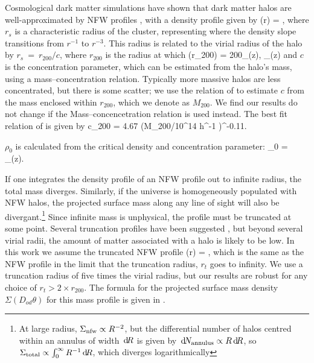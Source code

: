 \documentclass[useAMS,usenatbib]{mn2e}
\begin{document}
Cosmological dark matter simulations have shown that dark matter
halos are well-approximated by NFW profiles \citep{NFW}, with a density
profile given by
\be\label{eq:rhonfw}
\rho(r) = 
,
\ee
where $r_{s}$ is a characteristic radius of the cluster, representing where
the density slope transitions from $r^{-1}$ to $r^{-3}$. This radius is related
to the virial radius of the halo by $r_{s}~=~r_{200}/c$, where $r_{200}$ is the radius at 
which 
\be
\rho(r_{200}) = 200\rho_{{}}(z),  \rho_{}(z) \equiv {}
\ee
and $c$ is the concentration parameter, which can be estimated from the halo's mass,
using a mass--concentration relation. Typically more massive halos are less concentrated,
but there is some scatter; we use the relation of \citet{Neto2007} to estimate $c$
from the mass enclosed within $r_{200}$, which we denote as $M_{200}$. We find our results do not change if the \citet{MaccioEtal2008} Mass--concencetration relation is used instead. The best fit relation of \citet{Neto2007} is given by
\be
c_{200} = 4.67 (M_{200}/10^{14} h^{-1} \Msun)^{-0.11}.
\ee
{}

$\rho_0$ is calculated from the critical density and concentration parameter:
\be
\rho_0 = \rho_{}(z).
\ee

If one integrates the density profile of an NFW profile out to infinite
radius, the total mass diverges. Similarly, if the universe is
homogeneously populated with NFW halos, the projected surface mass along
any line of sight will also be divergant.\footnote{At large radius,
$\Sigma_{\rm nfw} \propto R^{-2}$, but the differential number of halos
centred within an annulus of width $\, \mathrm{d} \! R$ is given by $\, \mathrm{d} \! N_{\rm
annulus} \propto R \, \mathrm{d} \! R$, so  $\Sigma_{\rm total} \propto
\int_{0}^{\infty} R^{-1} \, \mathrm{d} \! R$, which diverges logarithmically} Since
infinite mass is unphysical, the profile must be truncated at some
point. Several truncation profiles have been suggested
\citep[e.g][]{BMO}, but beyond several virial radii, the amount of
matter associated with a halo is likely to be low. In this work we
assume the truncated NFW profile
\be\label{eq:bmoprofile}
\rho(r) = 
,
\ee
which is the same as the NFW profile in the limit that the truncation
radius, $r_t$ goes to infinity. We use a truncation radius of five times
the virial radius, but our results are robust for any choice of $r_t>2
\times r_{200}$. The formula for the projected surface mass density 
$\Sigma(D_{od}\theta)$ for this
mass profile is given in \citet{BMO}. 
\end{document}
